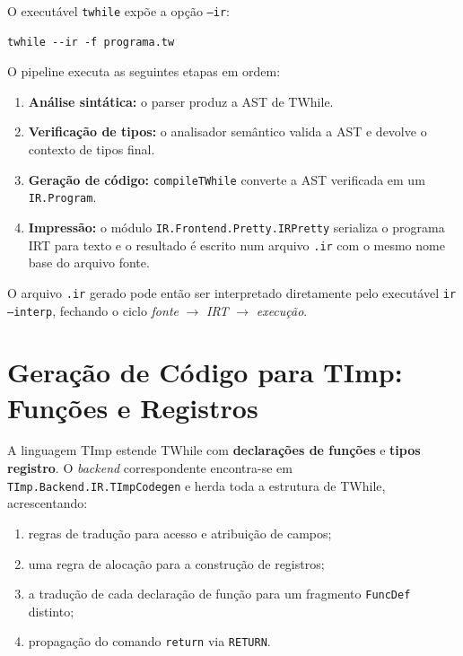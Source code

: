 O executável \texttt{twhile} expõe a opção \texttt{--ir}:

\begin{verbatim}
twhile --ir -f programa.tw
\end{verbatim}

O pipeline executa as seguintes etapas em ordem:
\begin{enumerate}
  \item \textbf{Análise sintática:} o parser produz a AST de TWhile.
  \item \textbf{Verificação de tipos:} o analisador semântico valida a AST
    e devolve o contexto de tipos final.
  \item \textbf{Geração de código:} \texttt{compileTWhile} converte a AST
    verificada em um \texttt{IR.Program}.
  \item \textbf{Impressão:} o módulo \texttt{IR.Frontend.Pretty.IRPretty}
    serializa o programa IRT para texto e o resultado é escrito num arquivo
    \texttt{.ir} com o mesmo nome base do arquivo fonte.
\end{enumerate}

O arquivo \texttt{.ir} gerado pode então ser interpretado diretamente pelo
executável \texttt{ir --interp}, fechando o ciclo
\emph{fonte} $\to$ \emph{IRT} $\to$ \emph{execução}.

\section{Geração de Código para TImp: Funções e Registros}
\label{sec:ir-timp}

A linguagem TImp estende TWhile com \textbf{declarações de funções} e
\textbf{tipos registro}. O \emph{backend} correspondente encontra-se em
\texttt{TImp.Backend.IR.TImpCodegen} e herda toda a estrutura de TWhile,
acrescentando:

\begin{enumerate}
  \item regras de tradução para acesso e atribuição de campos;
  \item uma regra de alocação para a construção de registros;
  \item a tradução de cada declaração de função para um fragmento
    \texttt{FuncDef} distinto;
  \item propagação do comando \texttt{return} via \texttt{RETURN}.
\end{enumerate}

